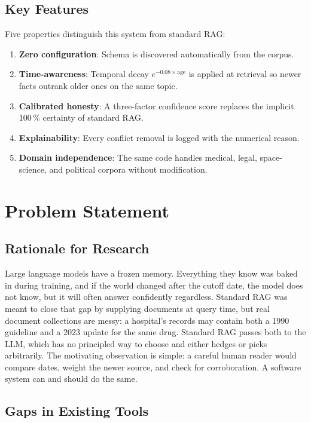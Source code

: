 \subsection{Key Features}

Five properties distinguish this system from standard RAG:
\begin{enumerate}\itemsep0pt
    \item \textbf{Zero configuration}: Schema is discovered automatically from the corpus.
    \item \textbf{Time-awareness}: Temporal decay $e^{-0.08 \times \text{age}}$ is
    applied at retrieval so newer facts outrank older ones on the same topic.
    \item \textbf{Calibrated honesty}: A three-factor confidence score replaces
    the implicit 100\,\% certainty of standard RAG.
    \item \textbf{Explainability}: Every conflict removal is logged with the
    numerical reason.
    \item \textbf{Domain independence}: The same code handles medical, legal,
    space-science, and political corpora without modification.
\end{enumerate}

\section{Problem Statement}

\subsection{Rationale for Research}

Large language models have a frozen memory. Everything they know was baked in
during training, and if the world changed after the cutoff date, the model does
not know, but it will often answer confidently regardless. Standard RAG was
meant to close that gap by supplying documents at query time, but real document
collections are messy: a hospital's records may contain both a 1990 guideline
and a 2023 update for the same drug. Standard RAG passes both to the LLM,
which has no principled way to choose and either hedges or picks arbitrarily.
The motivating observation is simple: a careful human reader would compare
dates, weight the newer source, and check for corroboration. A software system
can and should do the same.

\subsection{Gaps in Existing Tools}

